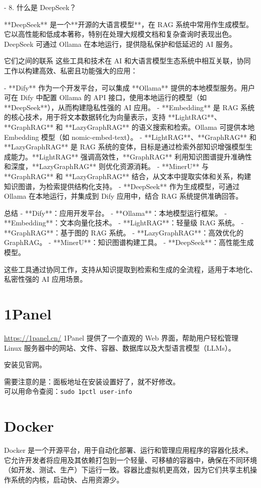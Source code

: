 - 8. 什么是 DeepSeek？

**DeepSeek** 是一个**开源的大语言模型**，在 RAG 系统中常用作生成模型。它以高性能和低成本著称，特别在处理大规模文档和复杂查询时表现出色。DeepSeek 可通过 Ollama 在本地运行，提供隐私保护和低延迟的 AI 服务。

 它们之间的联系
这些工具和技术在 AI 和大语言模型生态系统中相互关联，协同工作以构建高效、私密且功能强大的应用：

- **Dify** 作为一个开发平台，可以集成 **Ollama** 提供的本地模型服务。用户可在 Dify 中配置 Ollama 的 API 接口，使用本地运行的模型（如 **DeepSeek**），从而构建隐私性强的 AI 应用。
- **Embedding** 是 RAG 系统的核心技术，用于将文本数据转化为向量表示，支持 **LightRAG**、**GraphRAG** 和 **LazyGraphRAG** 的语义搜索和检索。Ollama 可提供本地 Embedding 模型（如 nomic-embed-text）。
- **LightRAG**、**GraphRAG** 和 **LazyGraphRAG** 是 RAG 系统的变体，目标是通过检索外部知识增强模型生成能力。**LightRAG** 强调高效性，**GraphRAG** 利用知识图谱提升准确性和深度，**LazyGraphRAG** 则优化资源消耗。
- **MinerU** 与 **GraphRAG** 和 **LazyGraphRAG** 结合，从文本中提取实体和关系，构建知识图谱，为检索提供结构化支持。
- **DeepSeek** 作为生成模型，可通过 Ollama 在本地运行，并集成到 Dify 应用中，结合 RAG 系统提供准确回答。

总结
- **Dify**：应用开发平台。
- **Ollama**：本地模型运行框架。
- **Embedding**：文本向量化技术。
- **LightRAG**：轻量级 RAG 系统。
- **GraphRAG**：基于图的 RAG 系统。
- **LazyGraphRAG**：高效优化的 GraphRAG。
- **MinerU**：知识图谱构建工具。
- **DeepSeek**：高性能生成模型。

这些工具通过协同工作，支持从知识提取到检索和生成的全流程，适用于本地化、私密性强的 AI 应用场景。



\section{1Panel}
\url{https://1panel.cn/}
1Panel 提供了一个直观的 Web 界面，帮助用户轻松管理 Linux 服务器中的网站、文件、容器、数据库以及大型语言模型（LLMs）。

安装见官网。

需要注意的是：面板地址在安装设置好了，就不好修改。\\
可以用命令查阅：\verb|sudo 1pctl user-info|




\section{Docker}
Docker 是一个开源平台，用于自动化部署、运行和管理应用程序的容器化技术。它允许开发者将应用及其依赖打包到一个轻量、可移植的容器中，确保在不同环境（如开发、测试、生产）下运行一致。容器比虚拟机更高效，因为它们共享主机操作系统的内核，启动快、占用资源少。

